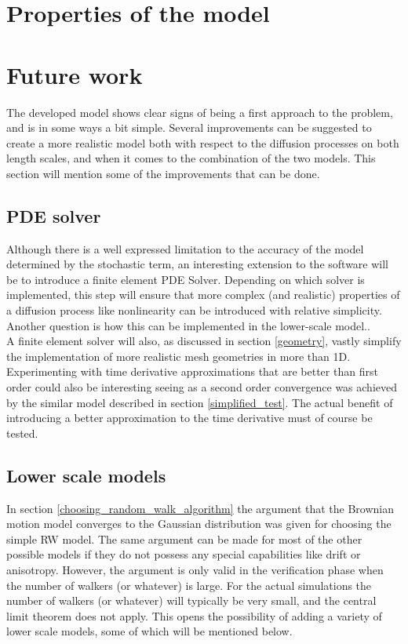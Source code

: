 \section{Properties of the model}



\section{Future work}
The developed model shows clear signs of being a first approach to the problem, and is in some ways a bit simple. 
Several improvements can be suggested to create a more realistic model both with respect to the diffusion processes on both length scales, and when it comes to the combination of the two models. 
This section will mention some of the improvements that can be done.

\subsection{PDE solver}
Although there is a well expressed limitation to the accuracy of the model determined by the stochastic term, an interesting extension to the software will be to introduce a finite element PDE Solver. 
Depending on which solver is implemented, this step will ensure that more complex (and realistic) properties of a diffusion process like nonlinearity can be introduced with relative simplicity. 
Another question is how this can be implemented in the lower-scale model..\\
A finite element solver will also, as discussed in section \ref{geometry}, vastly simplify the implementation of more realistic mesh geometries in more than 1D. \\
Experimenting with time derivative approximations that are better than first order could also be interesting seeing as a second order convergence was achieved by the similar model described in section \ref{simplified_test}. 
The actual benefit of introducing a better approximation to the time derivative must of course be tested.

\subsection{Lower scale models}
In section \ref{choosing_random_walk_algorithm} the argument that the Brownian motion model converges to the Gaussian distribution was given for choosing the simple RW model. 
The same argument can be made for most of the other possible models if they do not possess any special capabilities like drift or anisotropy. 
However, the argument is only valid in the verification phase when the number of walkers (or whatever) is large. 
For the actual simulations the number of walkers (or whatever) will typically be very small, and the central limit theorem does not apply. 
This opens the possibility of adding a variety of lower scale models, some of which will be mentioned below.

